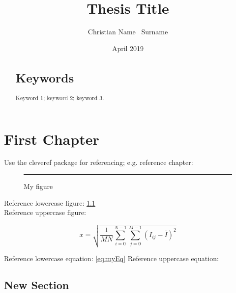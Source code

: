\documentclass[12pt]{book}
\title{Thesis Title}
\author{Christian Name \ Surname}
\date{April 2019}
\begin{document}
\maketitlepages

\begin{abstract}
    \blindtext
    \section*{Keywords}
    Keyword 1; keyword 2; keyword 3.
\end{abstract}

\sstableofcontents

\sslistoffigures

\sslistoftables

\sslistofcode

\begin{listofabbreviations}
\end{listofabbreviations}

\begin{listofsymbols}
\end{listofsymbols}

\chapter{First Chapter}\label{chap:one}

Use the cleveref package for referencing; e.g. reference chapter: 

\begin{figure}[h!]
  \centering
  \rule{20pt}{20pt}
  \caption{My figure}
  \label{fig:myfig1}
\end{figure}

\noindent Reference lowercase figure: \cref{fig:myfig1}\\
\noindent Reference uppercase figure: 

\begin{equation} 
  x = \sqrt{\frac{1}{M N}\sum_{i=0}^{N-1}\sum_{j=0}^{M - 1}(I_{ij} - \bar{I})^2} \label{eq:myEq}
\end{equation}

\noindent Reference lowercase equation: \cref{eq:myEq}
\noindent Reference uppercase equation: 

\section{New Section}
\end{document}
